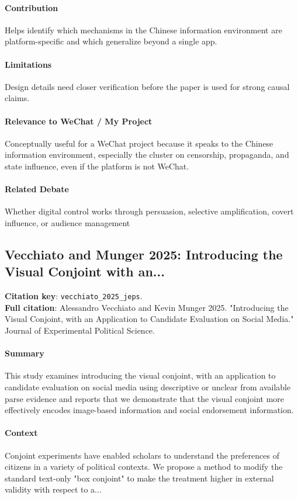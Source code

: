 \documentclass[12pt]{article}
\begin{document}
\paragraph{Contribution} Helps identify which mechanisms in the Chinese information environment are platform-specific and which generalize beyond a single app.

\paragraph{Limitations} Design details need closer verification before the paper is used for strong causal claims.

\paragraph{Relevance to WeChat / My Project} Conceptually useful for a WeChat project because it speaks to the Chinese information environment, especially the cluster on censorship, propaganda, and state influence, even if the platform is not WeChat.

\paragraph{Related Debate} Whether digital control works through persuasion, selective amplification, covert influence, or audience management


\subsection{Vecchiato and Munger 2025: Introducing the Visual Conjoint with an...}
\textbf{Citation key}: \texttt{vecchiato\_2025\_jeps}.\\
\textbf{Full citation}: Alessandro Vecchiato and Kevin Munger 2025. "Introducing the Visual Conjoint, with an Application to Candidate Evaluation on Social Media." Journal of Experimental Political Science.

\paragraph{Summary} This study examines introducing the visual conjoint, with an application to candidate evaluation on social media using descriptive or unclear from available parse evidence and reports that we demonstrate that the visual conjoint more effectively encodes image-based information and social endorsement information.

\paragraph{Context} Conjoint experiments have enabled scholars to understand the preferences of citizens in a variety of political contexts. We propose a method to modify the standard text-only "box conjoint" to make the treatment higher in external validity with respect to a...
\end{document}
